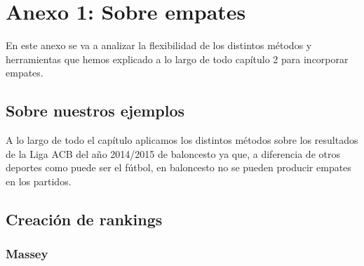 \chapter{Anexo 1: Sobre empates}
En este anexo se va a analizar la flexibilidad de los distintos métodos y herramientas que hemos explicado a lo largo de todo capítulo 2 para incorporar empates.
\section*{Sobre nuestros ejemplos}
A lo largo de todo el capítulo aplicamos los distintos métodos sobre los resultados de la Liga ACB del año 2014/2015 de baloncesto ya que, a diferencia de otros deportes como puede ser el fútbol, en baloncesto no se pueden producir empates en los partidos.
\section*{Creación de rankings}
\subsection*{Massey}
